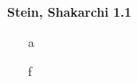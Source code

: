 \textbf{Stein, Shakarchi 1.1}

\begin{enumerate}[(i)]
    \item[a] 
    \pagebreak
    \item[f] 
\end{enumerate}
